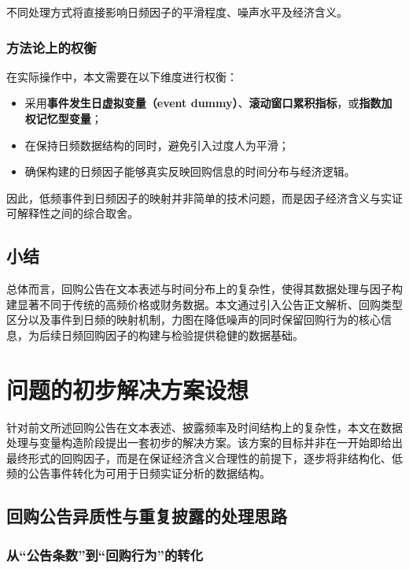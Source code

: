 \documentclass[a4paper,10pt]{article}
\begin{document}
不同处理方式将直接影响日频因子的平滑程度、噪声水平及经济含义。

\subsubsection{方法论上的权衡}

在实际操作中，本文需要在以下维度进行权衡：

\begin{itemize}
    \item 采用\textbf{事件发生日虚拟变量（event dummy）}、\textbf{滚动窗口累积指标}，或\textbf{指数加权记忆型变量}；
    \item 在保持日频数据结构的同时，避免引入过度人为平滑；
    \item 确保构建的日频因子能够真实反映回购信息的时间分布与经济逻辑。
\end{itemize}

因此，低频事件到日频因子的映射并非简单的技术问题，而是因子经济含义与实证可解释性之间的综合取舍。

\subsection{小结}

总体而言，回购公告在文本表述与时间分布上的复杂性，使得其数据处理与因子构建显著不同于传统的高频价格或财务数据。本文通过引入公告正文解析、回购类型区分以及事件到日频的映射机制，力图在降低噪声的同时保留回购行为的核心信息，为后续日频回购因子的构建与检验提供稳健的数据基础。




\section{问题的初步解决方案设想}

针对前文所述回购公告在文本表述、披露频率及时间结构上的复杂性，本文在数据处理与变量构造阶段提出一套初步的解决方案。该方案的目标并非在一开始即给出最终形式的回购因子，而是在保证经济含义合理性的前提下，逐步将非结构化、低频的公告事件转化为可用于日频实证分析的数据结构。

\subsection{回购公告异质性与重复披露的处理思路}

\subsubsection{从“公告条数”到“回购行为”的转化}
\end{document}
